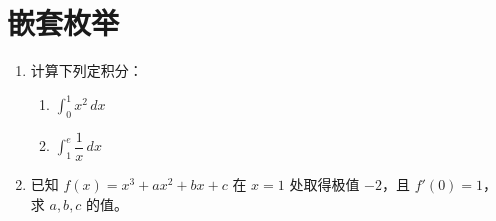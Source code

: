 \documentclass[11pt,a4paper]{article}
\begin{document}
\section*{嵌套枚举}

\begin{enumerate}[label=\textbf{题 \arabic*}]

\item 计算下列定积分：

\begin{enumerate}[label=(\arabic*)]
    \item \( \displaystyle\int_0^1 x^2 \,dx \)
    \item \( \displaystyle\int_1^e \dfrac{1}{x} \,dx \)
\end{enumerate}

\item 已知 \( f(x) = x^3 + ax^2 + bx + c \) 在 \( x = 1 \) 处取得极值 \( -2 \)，且 \( f'(0) = 1 \)，求 \( a, b, c \) 的值。

\end{enumerate}
\end{document}
